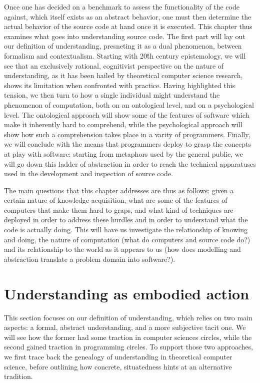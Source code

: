 Once one has decided on a benchmark to assess the functionality of the code against, which itself exists as an abstract behavior, one must then determine the actual behavior of the source code at hand once it is executed. This chapter thus examines what goes into understanding source code. The first part will lay out our definition of understanding, presneting it as a dual phenomenon, between formalism and contextualism. Starting with 20\^{th} century epistemology, we will see that an exclusively rational, cognitivist perspective on the nature of understanding, as it has been hailed by theoretical computer science research, shows its limitation when confronted with practice. Having highlighted this tension, we then turn to how a single individual might understand the phenomenon of computation, both on an ontological level, and on a psychological level. The ontological approach will show some of the features of software which make it inherently hard to comprehend, while the psychological approach will show how such a comprehension takes place in a varity of programmers. Finally, we will conclude with the means that programmers deploy to grasp the concepts at play with software: starting from metaphors used by the general public, we will go down this ladder of abstraction in order to reach the technical apparatuses used in the development and inspection of source code.

The main questions that this chapter addresses are thus as follows: given a certain nature of knowledge acquisition, what are some of the features of computers that make them hard to graps, and what kind of techniques are deployed in order to address these hurdles and in order to understand what the code is actually doing. This will have us investigate the relationship of knowing and doing, the nature of computation (what do computers and source code do?) and its relationship to the world as it appears to us (how does modelling and abstraction translate a problem domain into software?).

\section{Understanding as embodied action} %

This section focuses on our definition of understanding, which relies on two main aspects: a formal, abstract understanding, and a more subjective tacit one. We will see how the former had some traction in computer sciences circles, while the second gained traction in programming circles. To support those two approaches, we first trace back the genealogy of understanding in theoretical computer science, before outlining how concrete, situatedness hints at an alternative tradition.

